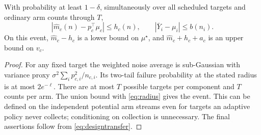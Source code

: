 \begin{lemma}
With probability at least $1-\delta$, simultaneously over all scheduled targets and ordinary arm counts through $T$,
\begin{equation}
 |\widehat m_c(n)-p_c^\top\mu_c|\le h_c(n),\qquad
 |\bar Y_i-\mu_i|\le b(n_i).
 \label{eq:designevent}
\end{equation}
On this event, $\widehat m_c-h_c$ is a lower bound on $\mu^\star$, and $\widehat m_c+h_c+a_c$ is an upper bound on $v_c$.
\label{lem:designconfidence}
\end{lemma}
\begin{proof}
For any fixed target the weighted noise average is sub-Gaussian with variance proxy $\sigma^2\sum_i p_{c,i}^2/n_{c,i}$. Its two-tail failure probability at the stated radius is at most $2e^{-\ell}$. There are at most $T$ possible targets per component and $T$ counts per arm. The union bound with \eqref{eq:radius} gives the event. This can be defined on the independent potential arm streams even for targets an adaptive policy never collects; conditioning on collection is unnecessary. The final assertions follow from \eqref{eq:designtransfer}.
\end{proof}

